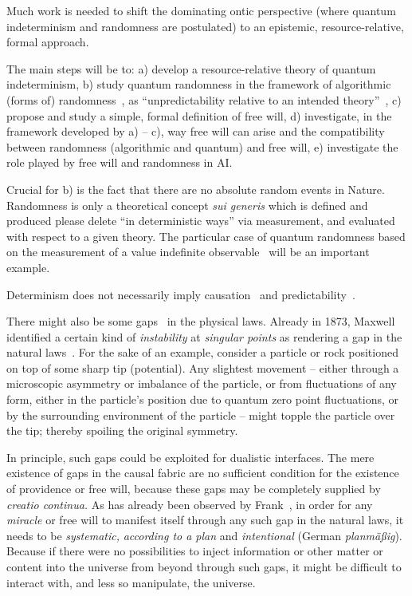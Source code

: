 \documentclass[11pt,  a4paper]{article}
\begin{document}
Much work is needed to shift the dominating ontic perspective (where quantum indeterminism and randomness are postulated) to
an epistemic, resource-relative, formal approach.

 The main steps will be to: a) develop a resource-relative theory of quantum indeterminism, b)
   study  quantum randomness   in the framework of algorithmic (forms of) randomness~\cite{8,AN}, as ``unpredictability relative to an intended theory''~\cite{2},
 c) propose and study a simple, formal definition of free will, d) investigate, in the framework developed by a) -- c), way free will can arise and the compatibility between  randomness (algorithmic and quantum) and free will, e) investigate the role played by free will and randomness in AI.


Crucial for b)  is the fact that there are no  absolute random events in Nature.
Randomness is only a theoretical concept  {\it sui generis} which is defined and produced {\color{green} please delete ``in deterministic ways''} via measurement, and evaluated with respect to a given theory. The  particular case of quantum randomness based on the measurement of a value indefinite observable~\cite{2} will be an important example.

{\color{green} Determinism does not necessarily imply causation~\cite{born-metaph-1950} and predictability~\cite{suppes-1993}.

There might also be some gaps~\cite{franke} in the physical laws.
Already in 1873, Maxwell identified a certain kind of {\em instability} at {\em singular points}
as rendering a gap in the natural laws~\cite[p.~211-212]{Campbell-1882}.
For the sake of an example, consider a particle or rock positioned on top of some sharp tip (potential).
Any slightest movement -- either through a microscopic asymmetry or imbalance of the particle,
or from fluctuations of any form, either in the particle's position due to quantum zero point fluctuations,
or by the surrounding environment of the particle --  might topple the particle over the tip;
thereby spoiling the original symmetry.

In principle, such gaps could
be exploited for dualistic interfaces.
The mere existence of gaps in the causal fabric are no sufficient condition for the existence of providence or free will,
because these gaps may be completely supplied by {\em creatio continua.}
As has already been observed by Frank~\cite[Chapter~{III}, Sects.~12--15]{frank},
in order for any {\em miracle} or free will to manifest itself
through any such gap in the natural laws, it needs to be {\em systematic,}
{\em according to a plan}
and
{\em intentional} (German {\it planm\"a\ss ig}).
Because if there were no possibilities to inject information or other matter or content
into the universe from beyond through such gaps, it might be difficult to interact with, and less so manipulate, the universe.

}
\end{document}
